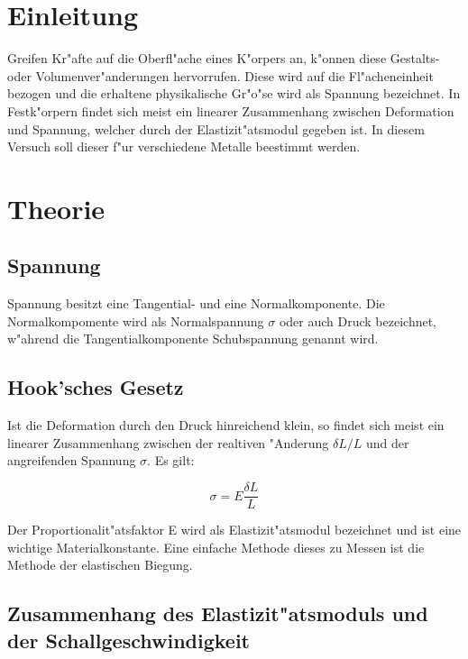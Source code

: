\section{Einleitung}
	\label{sec:einleitung}
	
	Greifen Kr"afte auf die Oberfl"ache eines K"orpers
	an, k"onnen diese Gestalts- oder Volumenver"anderungen hervorrufen. Diese wird auf die Fl"acheneinheit bezogen und die erhaltene physikalische Gr"o"se wird als Spannung bezeichnet.
	In Festk"orpern findet sich meist ein linearer Zusammenhang zwischen Deformation und Spannung, welcher durch der Elastizit"atsmodul gegeben ist. In diesem Versuch soll dieser f"ur verschiedene Metalle beestimmt werden.

\section{Theorie}
	\label{sec:theorie}

	\subsection{Spannung} %
	\label{sub:spannung}
	
		Spannung besitzt eine Tangential- und eine Normalkomponente. Die Normalkompomente wird als Normalspannung $\sigma$ oder auch Druck bezeichnet, w"ahrend die Tangentialkomponente Schubspannung genannt wird.

	\subsection{Hook'sches Gesetz} %
	\label{sub:hook_sches_gesetz}
	
		Ist die Deformation durch den Druck hinreichend klein, so findet sich meist ein linearer Zusammenhang zwischen der realtiven "Anderung $\delta L/L$ und der angreifenden Spannung $\sigma$. Es gilt:

		\begin{equation}
			\sigma = E \frac{\delta L}{L}
		\end{equation}

		Der Proportionalit"atsfaktor E wird als Elastizit"atsmodul bezeichnet und ist eine wichtige Materialkonstante.
		Eine einfache Methode dieses zu Messen ist die Methode der elastischen Biegung.

	\subsection{Zusammenhang des Elastizit"atsmoduls und der Schallgeschwindigkeit} %
	\label{sub:der_elastizit_atsmodul}

